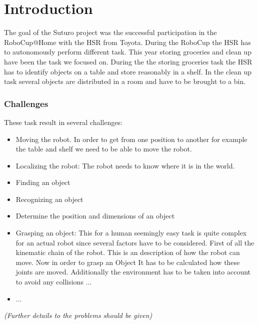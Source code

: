 \documentclass[main.tex]{subfiles}
\begin{document}
	\chapter{Introduction}
	\chapterauthor{}
	
	The goal of the Suturo project was the successful participation in the RoboCup@Home with the HSR from Toyota. During the RoboCup the HSR has to autonomously perform different task. 
	This year storing groceries and clean up have been the task we focused on. During the the storing groceries task the HSR has to identify objects on a table and store reasonably in a shelf. In the clean up task several objects are distributed in a room and have to be brought to a bin.
	
	\subsection{Challenges} 
	These task result in several challenges:
	\begin{itemize}
		\item Moving the robot. In order to get from one position to another for example the table and shelf we need to be able to move the robot. 
		\item Localizing the robot: The robot needs to know where it is in the world.
		\item Finding an object
		\item Recognizing an object
		\item Determine the position and dimensions of an object
		\item Grasping an object: This for a human seemingly easy task is quite complex for an actual robot since several factors have to be considered. First of all the kinematic chain of the robot. This is an description of how the robot can move. Now in order to grasp an Object It has to be calculated how these joints are moved. Additionally the environment has to be taken into account to avoid any collisions ...
		\item ...
	\end{itemize}
	
	\textit{(Further details to the problems should be given)}	
	
\end{document}
